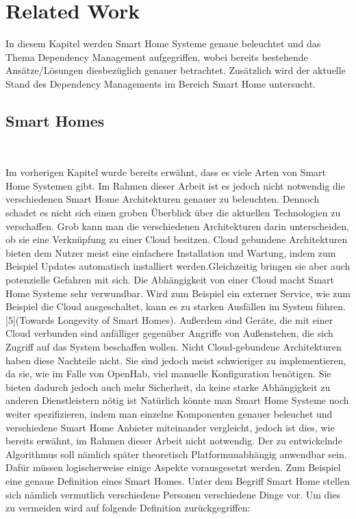 \chapter{Related Work}\label{ch:related_work}


In diesem Kapitel werden Smart Home Systeme genaue beleuchtet und  das Thema Dependency Management aufgegriffen, wobei bereits 
bestehende Ansätze/Lösungen diesbezüglich genauer betrachtet. Zusätzlich wird der aktuelle Stand des Dependency Managements im 
Bereich Smart Home untersucht.

\section{Smart Homes}
~\cite{Paper [12]}

Im vorherigen Kapitel wurde bereits erwähnt, dass es viele Arten von Smart Home Systemen gibt. Im Rahmen dieser Arbeit
ist es jedoch nicht notwendig die verschiedenen Smart Home Architekturen genauer zu beleuchten. Dennoch schadet es 
nicht sich einen groben Überblick über die aktuellen Technologien zu verschaffen. Grob kann man die
verschiedenen Architekturen darin unterscheiden, ob sie eine Verknüpfung zu einer Cloud besitzen. Cloud gebundene
Architekturen bieten dem Nutzer meist eine einfachere Installation und Wartung, indem zum 
Beispiel Updates automatisch installiert werden.Gleichzeitig bringen sie aber auch potenzielle Gefahren mit sich. Die 
Abhängigkeit von einer Cloud macht Smart Home Systeme sehr verwundbar. Wird zum Beispiel ein externer Service, wie zum
Beispiel die Cloud ausgeschaltet, kann es zu starken Ausfällen im System führen. [5](Towards Longevity of Smart Homes).
Außerdem sind Geräte, die mit einer Cloud verbunden sind anfälliger gegenüber Angriffe von Außenstehen, die sich Zugriff auf
das System beschaffen wollen.
Nicht Cloud-gebundene Architekturen haben diese Nachteile nicht. Sie sind jedoch meist schwieriger zu implementieren, da 
sie, wie im Falle von OpenHab, viel manuelle Konfiguration benötigen. Sie bieten dadurch jedoch auch mehr Sicherheit, da keine 
starke Abhängigkeit zu anderen Dienstleistern nötig ist
Natürlich könnte man Smart Home Systeme noch weiter spezifizieren, indem man einzelne Komponenten genauer beleuchet und 
verschiedene Smart Home Anbieter miteinander vergleicht, jedoch ist dies, wie bereits erwähnt, im Rahmen dieser 
Arbeit nicht notwendig. Der zu entwickelnde Algorithmus soll nämlich später theoretisch Platformunabhängig anwendbar sein.
Dafür müssen logischerweise einige Aspekte vorausgesetzt werden. Zum Beispiel eine genaue Definition eines Smart Homes.
Unter dem Begriff Smart Home stellen sich nämlich vermutlich verschiedene Personen verschiedene Dinge vor.
Um dies zu vermeiden wird auf folgende Definition zurückgegriffen:

